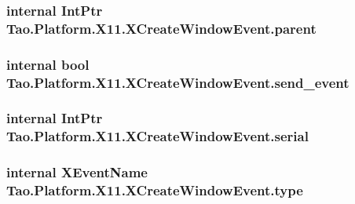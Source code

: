 \label{struct_tao_1_1_platform_1_1_x11_1_1_x_create_window_event_a8f1a5a273675fee615d71ebfc28323be}
\hypertarget{struct_tao_1_1_platform_1_1_x11_1_1_x_create_window_event_a704a971a3fec34c9bda129fa63fd2d5e}{
\subsubsection[{parent}]{\setlength{\rightskip}{0pt plus 5cm}internal IntPtr {\bf Tao.Platform.X11.XCreateWindowEvent.parent}}}
\label{struct_tao_1_1_platform_1_1_x11_1_1_x_create_window_event_a704a971a3fec34c9bda129fa63fd2d5e}
\hypertarget{struct_tao_1_1_platform_1_1_x11_1_1_x_create_window_event_aaeb611c7a917225dee50fc422c9afcdb}{
\subsubsection[{send\_\-event}]{\setlength{\rightskip}{0pt plus 5cm}internal bool {\bf Tao.Platform.X11.XCreateWindowEvent.send\_\-event}}}
\label{struct_tao_1_1_platform_1_1_x11_1_1_x_create_window_event_aaeb611c7a917225dee50fc422c9afcdb}
\hypertarget{struct_tao_1_1_platform_1_1_x11_1_1_x_create_window_event_acad3d5de8c2db4d3997f5d864d4844cc}{
\subsubsection[{serial}]{\setlength{\rightskip}{0pt plus 5cm}internal IntPtr {\bf Tao.Platform.X11.XCreateWindowEvent.serial}}}
\label{struct_tao_1_1_platform_1_1_x11_1_1_x_create_window_event_acad3d5de8c2db4d3997f5d864d4844cc}
\hypertarget{struct_tao_1_1_platform_1_1_x11_1_1_x_create_window_event_a7f7b06b3214897db284d5ca44d7a7d05}{
\subsubsection[{type}]{\setlength{\rightskip}{0pt plus 5cm}internal {\bf XEventName} {\bf Tao.Platform.X11.XCreateWindowEvent.type}}}
